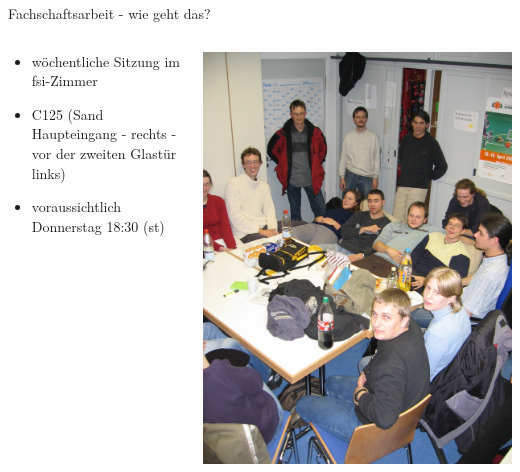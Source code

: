 \documentclass{beamer}
\begin{document}
	\begin{frame}{Fachschaftsarbeit - wie geht das?}
		\begin{columns}
			\begin{column}{.5\linewidth}
				\begin{itemize}
					\item wöchentliche Sitzung im fsi-Zimmer
					\item C125 (Sand Haupteingang - rechts - vor der zweiten Glastür links)
					\item voraussichtlich Donnerstag 18:30 (st)
				\end{itemize}
			\end{column}
			\begin{column}{0.5\linewidth}
				\includegraphics[width=\linewidth]{Sitzung.jpg}
			\end{column}
		\end{columns}
	\end{frame}
\end{document}
